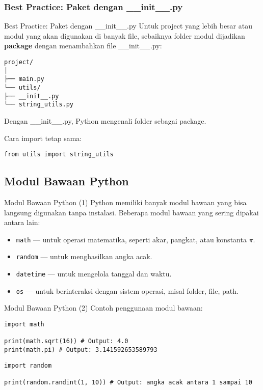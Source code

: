 \documentclass[aspectratio=169, table]{beamer}
\begin{document}
\subsubsection{Best Practice: Paket dengan __init__.py}
\begin{frame}[fragile]{Best Practice: Paket dengan __init__.py}
Untuk project yang lebih besar atau modul yang akan digunakan di banyak file, sebaiknya folder modul dijadikan \textbf{package} dengan menambahkan file __init__.py:

\begin{verbatim}
project/
│
├── main.py
└── utils/
├── __init__.py
└── string_utils.py
\end{verbatim}

Dengan __init__.py, Python mengenali folder sebagai package.

Cara import tetap sama:

\begin{lstlisting}[style=PythonStyle]
from utils import string_utils
\end{lstlisting}
\end{frame}

\subsection{Modul Bawaan Python}
\begin{frame}[fragile]{Modul Bawaan Python (1)}
Python memiliki banyak modul bawaan yang bisa langsung digunakan tanpa instalasi. Beberapa modul bawaan yang sering dipakai antara lain:

\begin{itemize}
  \item \texttt{math}  — untuk operasi matematika, seperti akar, pangkat, atau konstanta \(\pi\).
  \item \texttt{random} — untuk menghasilkan angka acak.
  \item \texttt{datetime} — untuk mengelola tanggal dan waktu.
  \item \texttt{os} — untuk berinteraksi dengan sistem operasi, misal folder, file, path.
\end{itemize}
\end{frame}

\begin{frame}[fragile]{Modul Bawaan Python (2)}
Contoh penggunaan modul bawaan:

\begin{lstlisting}[style=PythonStyle, caption={Kode Python: math_module.py}]
import math

print(math.sqrt(16)) # Output: 4.0
print(math.pi) # Output: 3.141592653589793
\end{lstlisting}

\begin{lstlisting}[style=PythonStyle, caption={Kode Python: random_module.py}]
import random

print(random.randint(1, 10)) # Output: angka acak antara 1 sampai 10
\end{lstlisting}
\end{frame}
\end{document}
